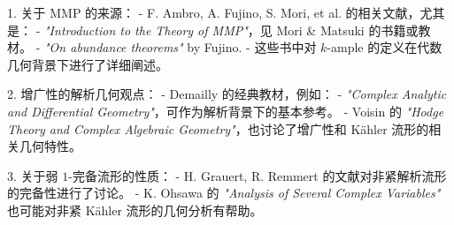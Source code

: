 \documentclass[lang=cn,zihao=-4,a4paper,fontset=none]{beautybook}
\begin{document}
\begin{solution}
1. 关于 MMP 的来源：
   - F. Ambro, A. Fujino, S. Mori, et al. 的相关文献，尤其是：
     -  \textit{"Introduction to the Theory of MMP"}，见 Mori \& Matsuki 的书籍或教材。
     -  \textit{"On abundance theorems"} by Fujino.
   - 这些书中对 $k$-ample 的定义在代数几何背景下进行了详细阐述。

2. 增广性的解析几何观点：
   - Demailly 的经典教材，例如：
     -  \textit{"Complex Analytic and Differential Geometry"}，可作为解析背景下的基本参考。
   - Voisin 的  \textit{"Hodge Theory and Complex Algebraic Geometry"}，也讨论了增广性和 Kähler 流形的相关几何特性。

3. 关于弱 $1$-完备流形的性质：
   - H. Grauert, R. Remmert 的文献对非紧解析流形的完备性进行了讨论。
   - K. Ohsawa 的  \textit{"Analysis of Several Complex Variables"} 也可能对非紧 Kähler 流形的几何分析有帮助。

\end{solution}
    


\end{document}
